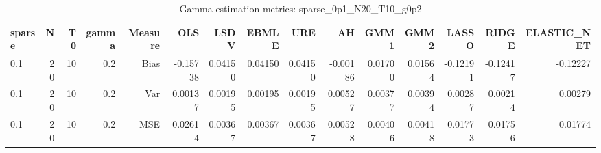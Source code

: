\begin{table}[!htbp]\centering
\caption{Gamma estimation metrics: sparse_0p1_N20_T10_g0p2}
\label{tab:table1_sparse_0p1_N20_T10_g0p2}
\begin{tabular}{lrrrrrrrrrrrrrr}
\hline
sparse & N & T0 & gamma & Measure & OLS & LSDV & EBMLE & URE & AH & GMM1 & GMM2 & LASSO & RIDGE & ELASTIC_NET \\
\hline
0.1 & 20 & 10 & 0.2 & Bias & -0.15738 & 0.04150 & 0.04150 & 0.04150 & -0.00186 & 0.01700 & 0.01564 & -0.12191 & -0.12417 & -0.12227 \\
0.1 & 20 & 10 & 0.2 & Var & 0.00137 & 0.00195 & 0.00195 & 0.00195 & 0.00527 & 0.00377 & 0.00394 & 0.00287 & 0.00214 & 0.00279 \\
0.1 & 20 & 10 & 0.2 & MSE & 0.02614 & 0.00367 & 0.00367 & 0.00367 & 0.00528 & 0.00406 & 0.00418 & 0.01773 & 0.01756 & 0.01774 \\
\hline
\end{tabular}
\end{table}

